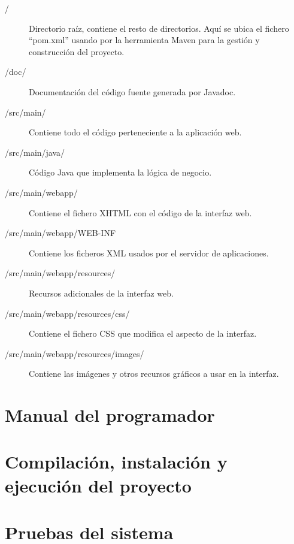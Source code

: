 \begin{description}
  \item[/] Directorio raíz, contiene el resto de directorios. Aquí se ubica el
  fichero ``pom.xml'' usando por la herramienta Maven para la gestión y
  construcción del proyecto.
  \item[/doc/] Documentación del código fuente generada por Javadoc.
  \item[/src/main/] Contiene todo el código perteneciente a la aplicación web.
  \item[/src/main/java/] Código Java que implementa la lógica de negocio.
  \item[/src/main/webapp/] Contiene el fichero XHTML con el código de la
  interfaz web.
  \item[/src/main/webapp/WEB-INF] Contiene los ficheros XML usados por
  el servidor de aplicaciones.
  \item[/src/main/webapp/resources/] Recursos adicionales de la interfaz web.
  \item[/src/main/webapp/resources/css/] Contiene el fichero CSS que modifica el
  aspecto de la interfaz.
  \item[/src/main/webapp/resources/images/] Contiene las imágenes y otros
  recursos gráficos a usar en la interfaz.
\end{description}



\section{Manual del programador}



\cleardoublepage
\section{Compilación, instalación y ejecución del proyecto}

\section{Pruebas del sistema}
